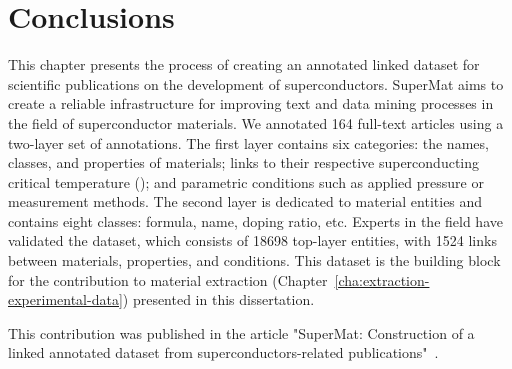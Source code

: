 \section{Conclusions}
This chapter presents the process of creating an annotated linked dataset for scientific publications on the development of superconductors. SuperMat aims to create a reliable infrastructure for improving text and data mining processes in the field of superconductor materials. We annotated 164 full-text articles using a two-layer set of annotations. The first layer contains six categories: the names, classes, and properties of materials; links to their respective superconducting critical temperature
(\tc); and parametric conditions such as applied pressure or measurement methods.
The second layer is dedicated to material entities and contains eight classes: formula,
name, doping ratio, etc.
Experts in the field have validated the dataset, which consists of 18698 top-layer entities, with 1524 links between materials, properties, and conditions.
This dataset is the building block for the contribution to material extraction (Chapter~\ref{cha:extraction-experimental-data}) presented in this dissertation. 

This contribution was published in the article "SuperMat: Construction of a linked annotated dataset from superconductors-related publications"~\cite{foppiano2021supermat}. 










